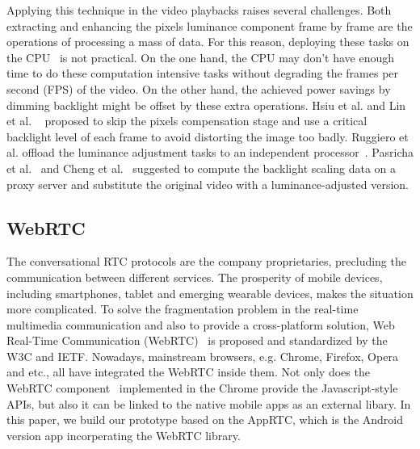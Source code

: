 Applying this technique in the video playbacks raises several
challenges. Both extracting and enhancing the pixels luminance
component frame by frame are the operations of processing a mass of
data. For this reason, deploying these tasks on the CPU~\cite{CHP07,
  CSC02} is not practical. On the one hand, the CPU may don't have
enough time to do these computation intensive tasks without degrading
the frames per second (FPS) of the video. On the other hand, the
achieved power savings by dimming backlight might be offset by these
extra operations. Hsiu et al. and Lin et al. ~\cite{LHH14, HLH11} proposed to
skip the pixels compensation stage and use a critical backlight level
of each frame to avoid distorting the image too badly. Ruggiero et
al. offload the luminance adjustment tasks to an independent
processor~\cite{RBB08}. Pasricha et al.~\cite{PMLDV03} and Cheng et
al.~\cite{CMEDV07} suggested to compute the backlight scaling data on
a proxy server and substitute the original video with a
luminance-adjusted version.


\subsection{WebRTC}

The conversational RTC protocols are the company proprietaries,
precluding the communication between different services.  The
prosperity of mobile devices, including smartphones, tablet
and emerging wearable devices, makes the situation more
complicated. To solve the fragmentation problem in the real-time
multimedia communication and also to provide a cross-platform
solution, Web Real-Time Communication (WebRTC)~\cite{webrtcstandard}
is proposed and standardized by the W3C and IETF. Nowadays, mainstream
browsers, e.g. Chrome, Firefox, Opera and etc., all have integrated
the WebRTC inside them. Not only does the WebRTC
component~\cite{webrtcproject} implemented in the Chrome provide the
Javascript-style APIs, but also it can be linked to the native mobile
apps as an external libary. In this paper, we build our prototype
based on the AppRTC, which is the Android version app incorperating
the WebRTC library.

